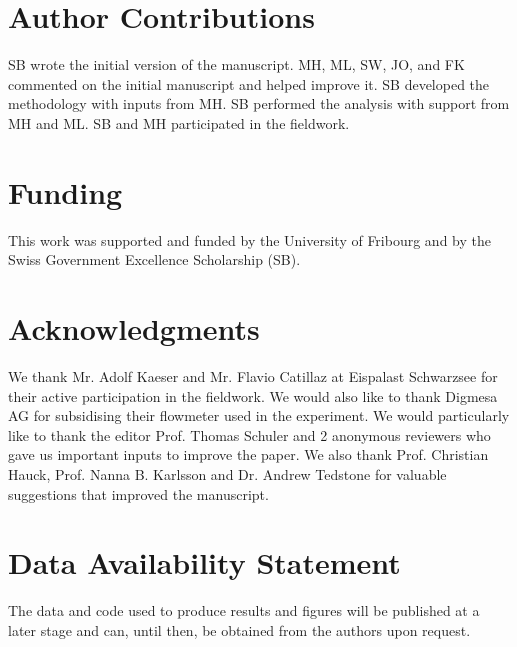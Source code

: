 \documentclass[utf8]{frontiersSCNS} %
\begin{document}
\section*{Author Contributions} SB wrote the initial version of the manuscript. MH, ML, SW, JO, and FK commented on
the initial manuscript and helped improve it. SB developed the methodology with inputs from MH. SB performed the
analysis with support from MH and ML. SB and MH participated in the fieldwork.

\section*{Funding} This work was supported and funded by the University of Fribourg and by the Swiss Government
Excellence Scholarship (SB).

\section*{Acknowledgments} We thank Mr. Adolf Kaeser and Mr. Flavio Catillaz at Eispalast Schwarzsee for their active
participation in the fieldwork. We would also like to thank Digmesa AG for subsidising their flowmeter used in the
experiment. We would particularly like to thank the editor Prof. Thomas Schuler and 2 anonymous reviewers who gave us
important inputs to improve the paper. We also thank Prof. Christian Hauck, Prof. Nanna B. Karlsson and Dr. Andrew
Tedstone for valuable suggestions that improved the manuscript.


\section*{Data Availability Statement} The data and code used to produce results and figures will be published at a
later stage and can, until then, be obtained from the authors upon request.

 
\end{document}

